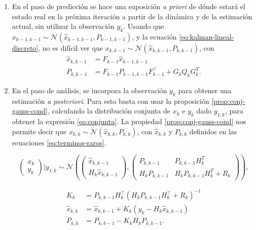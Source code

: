 \begin{enumerate}
\def\labelenumi{\arabic{enumi}.}
\item
  En el paso de predicción se hace una suposición \emph{a priori} de dónde estará el estado real en la próxima iteración a partir de la dinámica y de la estimación actual, sin utilizar la observación \(y_k\). Usando que \(x_{k-1,k-1} \sim \mathcal{N}(\hat{x}_{k-1,k-1}, P_{k-1,k-1})\), y la ecuación \ref{eq:kalman-lineal-discreto}, no es difícil ver que \(x_{k,k-1} \sim \mathcal{N}(\hat{x}_{k,k-1}, P_{k,k-1})\), con 
    \begin{equation}
    \begin{aligned}
    \hat{x}_{k,k-1} &= F_{k-1} \hat{x}_{k-1,k-1} \\
    P_{k,k-1} &= F_{k-1} P_{k-1,k-1} F_{k-1}^{\top} + G_k Q_k G_k^T.
    \end{aligned}
    \end{equation}
\item
  En el paso de análisis, se incorpora la observación \(y_k\) para obtener una estimación \emph{a posteriori}. Para esto basta con usar la proposición \ref{prop:conj-gauss-cond}, calculando la distribución conjunta de \(x_k\) e \(y_k\) dado \(y_{1:k}\), para obtener la expresión \ref{eq:conjunta}. La propiedad \ref{prop:conj-gauss-cond} nos permite decir que \(
    x_{k,k} \sim
     \mathcal{N} \left( \hat{x}_{k,k}, P_{k,k} \right)
    \), con \(\hat{x}_{k,k}\) y \(P_{k,k}\) definidos en las ecuaciones \ref{eq:terminos-raros}.
  
    \begin{equation}\label{eq:conjunta}
    \begin{pmatrix}
    x_k \\
    y_k
    \end{pmatrix} \Big| y_{1:k} \sim \mathcal{N}\left(
    \begin{pmatrix}
    \hat{x}_{k, k-1} \\
    H_k \hat{x}_{k,k-1}
    \end{pmatrix},
    \begin{pmatrix}
    P_{k,k-1} & P_{k,k-1} H^T_{k}\\
    H_{k}P_{k,k-1}  & H_{k}P_{k,k-1}H_{k}^T + R_k
    \end{pmatrix}  
    \right),
    \end{equation}

    \begin{equation}\label{eq:terminos-raros}
    \begin{aligned}
    K_k &= P_{k,k-1} H^{\top}_{k}(H_{k}P_{k,k-1}H_{k}^{\top} + R_k)^{-1}\\
    \hat{x}_{k,k} &= \hat{x}_{k, k-1} + K_k(y_k-H_k \hat{x}_{k,k-1}) \\
    P_{k,k} &= P_{k,k-1}- K_k H_{k}P_{k,k-1}. \\
    \end{aligned}
    \end{equation}
\end{enumerate}
